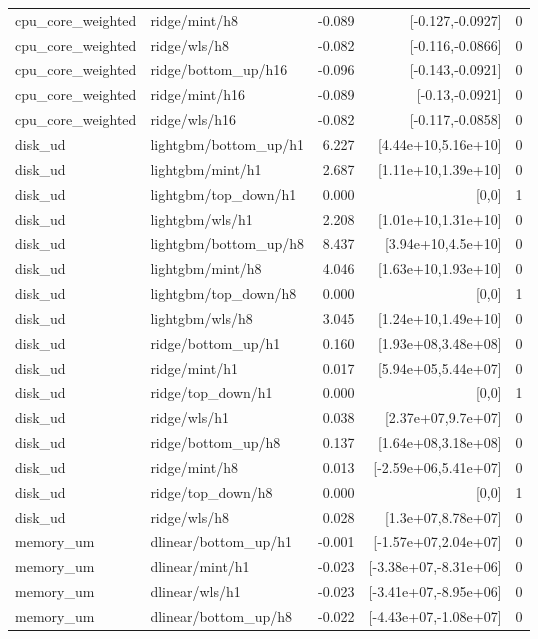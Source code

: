 \begin{tabular}{llrrr}
cpu_core_weighted & ridge/mint/h8 & -0.089 & [-0.127,-0.0927] & 0 \\
cpu_core_weighted & ridge/wls/h8 & -0.082 & [-0.116,-0.0866] & 0 \\
cpu_core_weighted & ridge/bottom_up/h16 & -0.096 & [-0.143,-0.0921] & 0 \\
cpu_core_weighted & ridge/mint/h16 & -0.089 & [-0.13,-0.0921] & 0 \\
cpu_core_weighted & ridge/wls/h16 & -0.082 & [-0.117,-0.0858] & 0 \\
disk_ud & lightgbm/bottom_up/h1 & 6.227 & [4.44e+10,5.16e+10] & 0 \\
disk_ud & lightgbm/mint/h1 & 2.687 & [1.11e+10,1.39e+10] & 0 \\
disk_ud & lightgbm/top_down/h1 & 0.000 & [0,0] & 1 \\
disk_ud & lightgbm/wls/h1 & 2.208 & [1.01e+10,1.31e+10] & 0 \\
disk_ud & lightgbm/bottom_up/h8 & 8.437 & [3.94e+10,4.5e+10] & 0 \\
disk_ud & lightgbm/mint/h8 & 4.046 & [1.63e+10,1.93e+10] & 0 \\
disk_ud & lightgbm/top_down/h8 & 0.000 & [0,0] & 1 \\
disk_ud & lightgbm/wls/h8 & 3.045 & [1.24e+10,1.49e+10] & 0 \\
disk_ud & ridge/bottom_up/h1 & 0.160 & [1.93e+08,3.48e+08] & 0 \\
disk_ud & ridge/mint/h1 & 0.017 & [5.94e+05,5.44e+07] & 0 \\
disk_ud & ridge/top_down/h1 & 0.000 & [0,0] & 1 \\
disk_ud & ridge/wls/h1 & 0.038 & [2.37e+07,9.7e+07] & 0 \\
disk_ud & ridge/bottom_up/h8 & 0.137 & [1.64e+08,3.18e+08] & 0 \\
disk_ud & ridge/mint/h8 & 0.013 & [-2.59e+06,5.41e+07] & 0 \\
disk_ud & ridge/top_down/h8 & 0.000 & [0,0] & 1 \\
disk_ud & ridge/wls/h8 & 0.028 & [1.3e+07,8.78e+07] & 0 \\
memory_um & dlinear/bottom_up/h1 & -0.001 & [-1.57e+07,2.04e+07] & 0 \\
memory_um & dlinear/mint/h1 & -0.023 & [-3.38e+07,-8.31e+06] & 0 \\
memory_um & dlinear/wls/h1 & -0.023 & [-3.41e+07,-8.95e+06] & 0 \\
memory_um & dlinear/bottom_up/h8 & -0.022 & [-4.43e+07,-1.08e+07] & 0 \\

\end{tabular}
